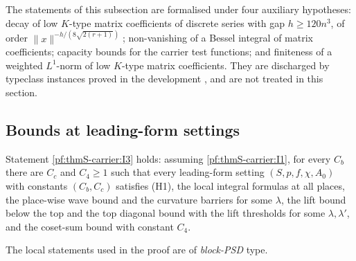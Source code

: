 \begin{remark}\label{pf:thmS-carrier:rem-facts}
The statements of this subsection are formalised under four auxiliary hypotheses: decay of low $K$-type matrix coefficients
of discrete series with gap $h\ge120n^3$, of order $\|x\|^{-h/(8\sqrt{2(r+1)})}$; non-vanishing of a Bessel integral of matrix
coefficients; capacity bounds for the carrier test functions; and finiteness of a weighted $L^1$-norm of low $K$-type matrix
coefficients. They are discharged by typeclass instances proved in the development \cite{LeanSource2026}, and are not
treated in this section.
\end{remark}

\subsection{Bounds at leading-form settings}\label{sec:pf:thmS-carrier:built}

\begin{theorem}\label{pf:thmS-carrier:builtbounds}
Statement \ref{pf:thmS-carrier:I3} holds: assuming \ref{pf:thmS-carrier:I1}, for every $C_b$ there are $C_c$ and $C_4\ge1$ such
that every leading-form setting $(S,p,f,\chi,A_0)$ with constants $(C_b,C_c)$ satisfies (H1), the local integral formulas at
all places, the place-wise wave bound and the curvature barriers for some $\lambda$, the lift bound below the top and the
top diagonal bound with the lift thresholds for some $\lambda,\lambda'$, and the coset-sum bound with constant $C_4$.
\end{theorem}

The local statements used in the proof are of \emph{block-PSD} type.

